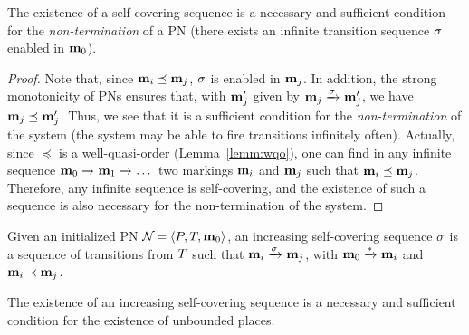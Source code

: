 \begin{lemm}
	\label{theo:self-cov-non-termination}
	The existence of a self-covering sequence is a necessary and sufficient condition for the \emph{non-termination} of a PN (\ie there exists an infinite transition sequence $\seqt$ enabled in $\mathbf{m}_0$).
\end{lemm}

\begin{proof}
Note that, since $\mathbf{m}_i \preceq \mathbf{m}_j$, $\seqt$ is enabled in $\mathbf{m}_j$.
In addition, the strong monotonicity of \acp{PN} ensures that, with $\mathbf{m}'_j$ given by $\mar_j \fire{\seqt} \mar'_j$, we have $\mathbf{m}_j \preceq \mathbf{m}'_j$.
Thus, we see that it is a sufficient condition for the \emph{non-termination} of the system (the system may be able to fire transitions infinitely often).
Actually, since $\preceq$ is a well-quasi-order (Lemma~\ref{lemm:wqo}), one can find in any infinite sequence $\mathbf{m}_0 \xrightarrow{}_{} \mathbf{m}_1 \xrightarrow{}_{} \dots$ two markings $\mathbf{m}_i$ and $\mathbf{m}_j$ such that $\mathbf{m}_i \preceq \mathbf{m}_j$.
Therefore, any infinite sequence is self-covering, and the existence of such a sequence is also necessary for the non-termination of the system.
\end{proof}

\begin{defi}
  Given an initialized \ac{PN} $\defPN$,
  an increasing self-covering sequence $\seqt$ is a sequence of transitions from $T$ such that
  \(
    \mar_i \fire{\seqt} \mar_j
  \),
  with $\mathbf{m}_0 \xrightarrow{*}_{} \mathbf{m}_i$
  and $\mathbf{m}_i \prec \mathbf{m}_j$.
\end{defi}

\begin{lemm}
	\label{theo:self-cov-non-termination}
	The existence of an increasing self-covering sequence is a necessary and sufficient condition for the existence of unbounded places.
\end{lemm}

